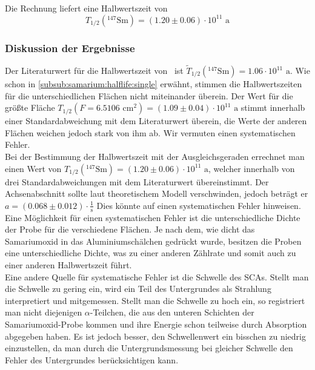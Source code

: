 Die Rechnung liefert eine Halbwertszeit von
\begin{equation}
  T_{1/2}({}^{147}\text{Sm}) = (1.20 \pm 0.06) \cdot 10^{11} \text{ a}
\end{equation}

\subsubsection{Diskussion der Ergebnisse}
\label{subsub:samarium:discussion}
Der Literaturwert für die Halbwertszeit von \samarium\, ist $\tilde{T}_{1/2}({}^{147}\text{Sm}) = 1.06 \cdot 10^{11} \text{ a}$.
Wie schon in \ref{subsub:samarium:halflife:single} erwähnt, stimmen die Halbwertszeiten für die unterschiedlichen Flächen nicht miteinander 
überein. Der Wert für die größte Fläche $T_{1/2}(F=6.5106 \text{ cm}^2) = (1.09 \pm 0.04)\cdot 10^{11} \text{ a}$ stimmt innerhalb einer 
Standardabweichung mit dem Literaturwert überein, die Werte der anderen Flächen weichen jedoch stark von ihm ab. Wir vermuten einen systematischen 
Fehler.\\
Bei der Bestimmung der Halbwertszeit mit der Ausgleichsgeraden errechnet man einen Wert von 
$T_{1/2}({}^{147}\text{Sm}) = (1.20 \pm 0.06) \cdot 10^{11} \text{ a}$, welcher innerhalb von drei Standardabweichungen mit dem Literaturwert 
übereinstimmt. Der Achsenabschnitt sollte laut theoretischem Modell verschwinden, jedoch beträgt er $a = (0.068  \pm 0.012 ) \cdot \frac{1}{\text{s}}$
Dies könnte auf einen systematischen Fehler hinweisen. \\
Eine Möglichkeit für einen systematischen Fehler ist die unterschiedliche Dichte der Probe für die verschiedene Flächen. Je nach dem, wie dicht 
das Samariumoxid in das Aluminiumschälchen gedrückt wurde, besitzen die Proben eine unterschiedliche Dichte, was zu einer anderen Zählrate und 
somit auch zu einer anderen Halbwertszeit führt. \\
Eine andere Quelle für systematische Fehler ist die Schwelle des SCAs. Stellt man die Schwelle zu 
gering ein, wird ein Teil des Untergrundes als Strahlung interpretiert und mitgemessen. Stellt man die Schwelle zu hoch ein, so registriert man 
nicht diejenigen $\alpha$-Teilchen, die aus den unteren Schichten der Samariumoxid-Probe kommen und ihre Energie schon teilweise durch Absorption 
abgegeben haben. Es ist jedoch besser, den Schwellenwert ein bisschen zu niedrig einzustellen, da man durch die Untergrundsmessung bei gleicher 
Schwelle den Fehler des Untergrundes berücksichtigen kann.

